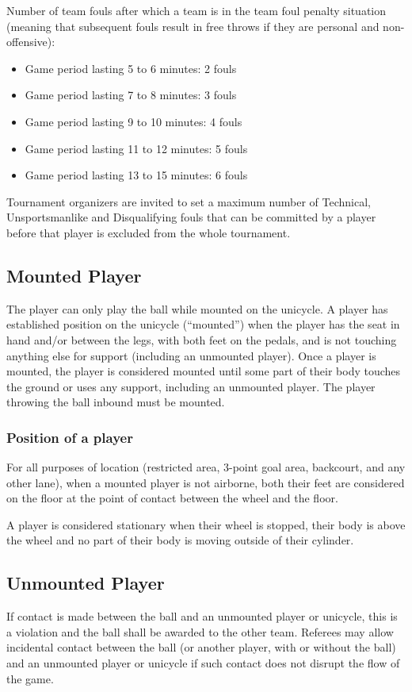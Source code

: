 Number of team fouls after which a team is in the team foul penalty situation 
(meaning that subsequent fouls result in free throws if they are personal and non-offensive):
\begin{itemize}
  \item Game period lasting 5 to 6 minutes: 2 fouls
  \item Game period lasting 7 to 8 minutes: 3 fouls
  \item Game period lasting 9 to 10 minutes: 4 fouls
  \item Game period lasting 11 to 12 minutes: 5 fouls
  \item Game period lasting 13 to 15 minutes: 6 fouls
\end{itemize}

Tournament organizers are invited to set a maximum number of Technical, Unsportsmanlike and Disqualifying fouls that 
can be committed by a player before that player is excluded from the whole tournament.

\subsection{Mounted Player}
The player can only play the ball while mounted on the unicycle.
A player has established position on the unicycle (``mounted'') when the player has the seat in hand and/or between the legs, with both feet on the pedals, and is not touching anything else for support (including an unmounted player).
Once a player is mounted, the player is considered mounted until some part of their body touches the ground or uses any support, including an unmounted player.
The player throwing the ball inbound must be mounted.

\subsubsection{Position of a player}

For all purposes of location (restricted area, 3-point goal area, backcourt, and any other lane),
when a mounted player is not airborne, both their feet are considered on the floor
at the point of contact between the wheel and the floor.

A player is considered stationary when their wheel is stopped, their body is above
the wheel and no part of their body is moving outside of their cylinder.

\subsection{Unmounted Player}
If contact is made between the ball and an unmounted player or unicycle, this is a violation and the ball shall be awarded to the other team.
Referees may allow incidental contact between the ball (or another player, with or without the ball) and an unmounted player or 
unicycle if such contact does not disrupt the flow of the game.

